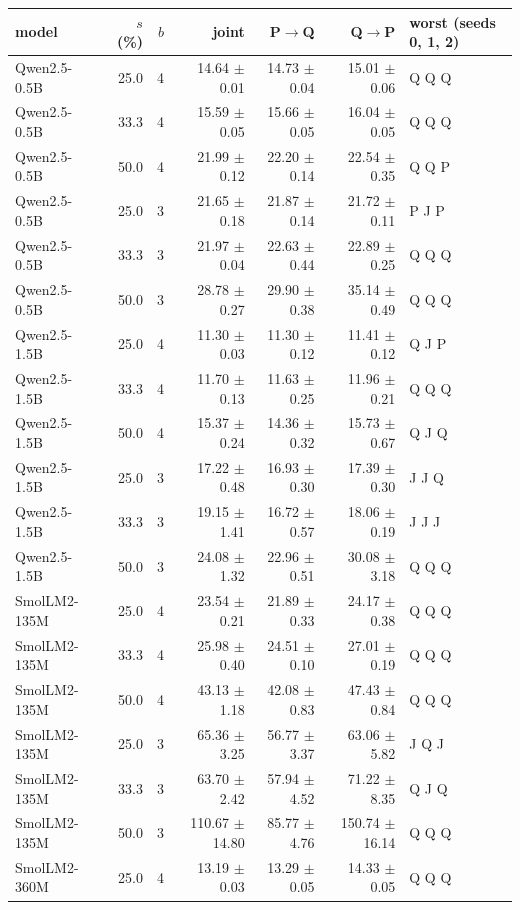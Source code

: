 \documentclass{article}
\begin{document}
\begin{longtable}{lrrrrrl}
\toprule model & $s$ (\%) & $b$ & joint & P$\to$Q & Q$\to$P & worst (seeds 0, 1, 2) \\ \midrule \endhead
Qwen2.5-0.5B & 25.0 & 4 & 14.64 $\pm$ 0.01 & 14.73 $\pm$ 0.04 & 15.01 $\pm$ 0.06 & Q Q Q \\
Qwen2.5-0.5B & 33.3 & 4 & 15.59 $\pm$ 0.05 & 15.66 $\pm$ 0.05 & 16.04 $\pm$ 0.05 & Q Q Q \\
Qwen2.5-0.5B & 50.0 & 4 & 21.99 $\pm$ 0.12 & 22.20 $\pm$ 0.14 & 22.54 $\pm$ 0.35 & Q Q P \\
Qwen2.5-0.5B & 25.0 & 3 & 21.65 $\pm$ 0.18 & 21.87 $\pm$ 0.14 & 21.72 $\pm$ 0.11 & P J P \\
Qwen2.5-0.5B & 33.3 & 3 & 21.97 $\pm$ 0.04 & 22.63 $\pm$ 0.44 & 22.89 $\pm$ 0.25 & Q Q Q \\
Qwen2.5-0.5B & 50.0 & 3 & 28.78 $\pm$ 0.27 & 29.90 $\pm$ 0.38 & 35.14 $\pm$ 0.49 & Q Q Q \\
Qwen2.5-1.5B & 25.0 & 4 & 11.30 $\pm$ 0.03 & 11.30 $\pm$ 0.12 & 11.41 $\pm$ 0.12 & Q J P \\
Qwen2.5-1.5B & 33.3 & 4 & 11.70 $\pm$ 0.13 & 11.63 $\pm$ 0.25 & 11.96 $\pm$ 0.21 & Q Q Q \\
Qwen2.5-1.5B & 50.0 & 4 & 15.37 $\pm$ 0.24 & 14.36 $\pm$ 0.32 & 15.73 $\pm$ 0.67 & Q J Q \\
Qwen2.5-1.5B & 25.0 & 3 & 17.22 $\pm$ 0.48 & 16.93 $\pm$ 0.30 & 17.39 $\pm$ 0.30 & J J Q \\
Qwen2.5-1.5B & 33.3 & 3 & 19.15 $\pm$ 1.41 & 16.72 $\pm$ 0.57 & 18.06 $\pm$ 0.19 & J J J \\
Qwen2.5-1.5B & 50.0 & 3 & 24.08 $\pm$ 1.32 & 22.96 $\pm$ 0.51 & 30.08 $\pm$ 3.18 & Q Q Q \\
SmolLM2-135M & 25.0 & 4 & 23.54 $\pm$ 0.21 & 21.89 $\pm$ 0.33 & 24.17 $\pm$ 0.38 & Q Q Q \\
SmolLM2-135M & 33.3 & 4 & 25.98 $\pm$ 0.40 & 24.51 $\pm$ 0.10 & 27.01 $\pm$ 0.19 & Q Q Q \\
SmolLM2-135M & 50.0 & 4 & 43.13 $\pm$ 1.18 & 42.08 $\pm$ 0.83 & 47.43 $\pm$ 0.84 & Q Q Q \\
SmolLM2-135M & 25.0 & 3 & 65.36 $\pm$ 3.25 & 56.77 $\pm$ 3.37 & 63.06 $\pm$ 5.82 & J Q J \\
SmolLM2-135M & 33.3 & 3 & 63.70 $\pm$ 2.42 & 57.94 $\pm$ 4.52 & 71.22 $\pm$ 8.35 & Q J Q \\
SmolLM2-135M & 50.0 & 3 & 110.67 $\pm$ 14.80 & 85.77 $\pm$ 4.76 & 150.74 $\pm$ 16.14 & Q Q Q \\
SmolLM2-360M & 25.0 & 4 & 13.19 $\pm$ 0.03 & 13.29 $\pm$ 0.05 & 14.33 $\pm$ 0.05 & Q Q Q \\

\end{longtable}
\end{document}
